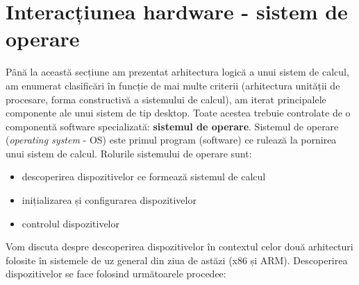 \section{Interacțiunea hardware - sistem de operare}
\label{sec:hw:os-interact}

Până la această secțiune am prezentat arhitectura logică a unui sistem de
calcul, am enumerat clasificări în funcție de mai multe criterii (arhitectura
unității de procesare, forma constructivă a sistemului de calcul), am iterat
principalele componente ale unui sistem de tip desktop. Toate acestea trebuie
controlate de o componentă software specializată: \textbf{sistemul de operare}.
Sistemul de operare (\textit{operating system} - OS) este primul program
(software) ce rulează la pornirea unui sistem de calcul. Rolurile sistemului de
operare sunt:

\begin{itemize}
  \item descoperirea dispozitivelor ce formează sistemul de calcul
  \item inițializarea și configurarea dispozitivelor
  \item controlul dispozitivelor
\end{itemize}

Vom discuta despre descoperirea dispozitivelor în contextul celor două
arhitecturi folosite în sistemele de uz general din ziua de astăzi (x86 și ARM).
Descoperirea dispozitivelor se face folosind următoarele procedee:

